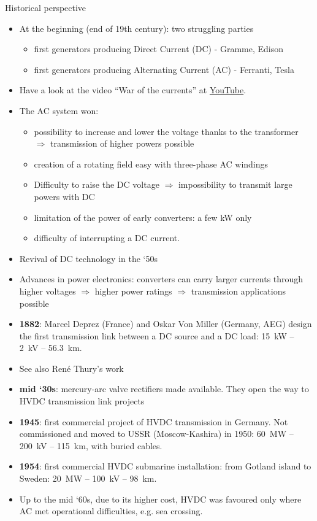 \begin{frame}[allowframebreaks]{Historical perspective}
\begin{itemize}
    \item At the beginning (end of 19th century): two struggling parties
    \begin{itemize}
        \item first generators producing Direct Current (DC) - Gramme, Edison
        \item first generators producing Alternating Current (AC) - Ferranti, Tesla
    \end{itemize}
    \item Have a look at the video ``War of the currents'' at \href{https://www.youtube.com/watch?v=dIfIRj0Crc8}{YouTube}.
    \item The AC system won:
    \begin{itemize}
        \item possibility to increase and lower the voltage thanks to the transformer $\Rightarrow$ transmission of higher powers possible
        \item creation of a rotating field easy with three-phase AC windings
        \item Difficulty to raise the DC voltage $\Rightarrow$ impossibility to transmit large powers with DC
        \item limitation of the power of early converters: a few kW only
        \item difficulty of interrupting a DC current.
    \end{itemize}
    \item Revival of DC technology in the ‘50s
\end{itemize}


\begin{itemize}
    \item Advances in power electronics: converters can carry larger currents through higher voltages $\Rightarrow$ higher power ratings $\Rightarrow$ transmission applications possible
    \item \textbf{1882}: Marcel Deprez (France) and Oskar Von Miller (Germany, AEG) design the first transmission link between a DC source and a DC load: \SI{15}{kW} -- \SI{2}{kV} -- \SI{56.3}{km}.
    \item See also René Thury's work
    \item \textbf{mid ‘30s}: mercury-arc valve rectifiers made available. They open the way to HVDC transmission link projects
    \item \textbf{1945}: first commercial project of HVDC transmission in Germany. Not commissioned and moved to USSR (Moscow-Kashira) in 1950: \SI{60}{MW} -- \SI{200}{kV} -- \SI{115}{km}, with buried cables.
    \item \textbf{1954}: first commercial HVDC submarine installation: from Gotland island to Sweden: \SI{20}{MW} -- \SI{100}{kV} -- \SI{98}{km}.
    \item Up to the mid ‘60s, due to its higher cost, HVDC was favoured only where AC met operational difficulties, e.g. sea crossing.
\end{itemize}



\end{frame}
